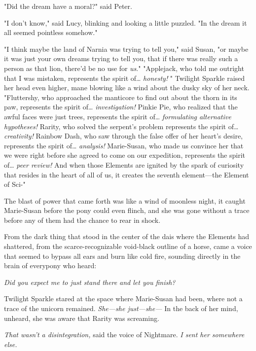 "Did the dream have a moral?" said Peter.

"I don't know," said Lucy, blinking and looking a little puzzled. "In the dream 
it all seemed pointless somehow."

"I think maybe the land of Narnia was trying to tell you," said Susan, "or 
maybe it was just your own dreams trying to tell you, that if there was really 
such a person as that lion, there'd be no use for \emph{us}."
\sbreak
"Applejack, who told me outright that I was mistaken, represents the spirit 
of{\ldots} \emph{honesty!} " Twilight Sparkle raised her head even higher, mane 
blowing like a wind about the dusky sky of her neck. "Fluttershy, who 
approached the manticore to find out about the thorn in its paw, represents the 
spirit of{\ldots} \emph{investigation!} Pinkie Pie, who realized that the awful 
faces were just trees, represents the spirit of{\ldots} \emph{formulating 
alternative hypotheses!} Rarity, who solved the serpent's problem represents 
the spirit of{\ldots} \emph{creativity!} Rainbow Dash, who saw through the 
false offer of her heart's desire, represents the spirit of{\ldots} 
\emph{analysis!} Marie-Susan, who made us convince her that we were right 
before she agreed to come on our expedition, represents the spirit of{\ldots} 
\emph{peer review!} And when those Elements are ignited by the spark of 
curiosity that resides in the heart of all of us, it creates the seventh 
element---the Element of Sci-"

The blast of power that came forth was like a wind of moonless night, it caught 
Marie-Susan before the pony could even flinch, and she was gone without a trace 
before any of them had the chance to rear in shock.

From the dark thing that stood in the center of the dais where the Elements had 
shattered, from the scarce-recognizable void-black outline of a horse, came a 
voice that seemed to bypass all ears and burn like cold fire, sounding directly 
in the brain of everypony who heard:

\emph{Did you expect me to just stand there and let you finish?}

Twilight Sparkle stared at the space where Marie-Susan had been, where not a 
trace of the unicorn remained. \emph{She---she just---she---} In the back of 
her mind, unheard, she was aware that Rarity was screaming.

\emph{That wasn't a disintegration,} said the voice of Nightmare. \emph{I sent 
her somewhere else.}


